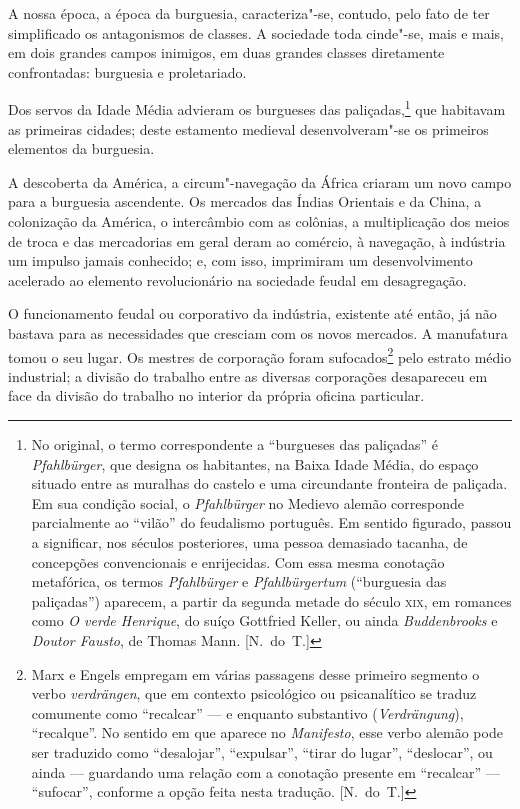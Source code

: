 A nossa época, a época da burguesia, caracteriza"-se, contudo, pelo
fato de ter simplificado os antagonismos de classes. A sociedade toda
cinde"-se, mais e mais, em dois grandes campos inimigos, em duas			\label{1}
grandes classes diretamente confrontadas: burguesia e proletariado.

Dos servos da Idade Média advieram os burgueses das   
paliçadas,\footnote{ No original, o termo correspondente a “burgueses das paliçadas” é\label{8}
\textit{Pfahlbürger}, que designa os habitantes, na Baixa Idade Média,
do espaço situado entre as muralhas do castelo e uma circundante
fronteira de paliçada. Em sua condição social, o \textit{Pfahlbürger}
no Medievo alemão corresponde parcialmente ao “vilão” do feudalismo
português. Em sentido figurado, passou a significar, nos séculos
posteriores, uma pessoa demasiado tacanha, de concepções convencionais
e enrijecidas. Com essa mesma conotação metafórica, os termos
\textit{Pfahlbürger} e \textit{Pfahlbürgertum} (“burguesia das
paliçadas”) aparecem, a partir da segunda metade do século \textsc{xix}, em
romances como \textit{O verde Henrique}, do suíço Gottfried Keller, ou
ainda \textit{Buddenbrooks} e \textit{Doutor Fausto}, de Thomas
Mann. [N.~do~T.]}
que habitavam as primeiras cidades; deste estamento medieval 
desenvolveram"-se os primeiros elementos da burguesia.

A descoberta da América, a circum"-navegação da África criaram um novo
campo para a burguesia ascendente. Os mercados das Índias Orientais e
da China, a colonização da América, o intercâmbio com as colônias, a
multiplicação dos meios de troca e das mercadorias em geral deram ao
comércio, à navegação, à indústria um impulso jamais conhecido; e, com
isso, imprimiram um desenvolvimento acelerado ao elemento
revolucionário na sociedade feudal em desagregação.

O funcionamento feudal ou corporativo da indústria, existente
até então, já não bastava para as necessidades que cresciam com os
novos mercados. A manufatura tomou o seu lugar. Os mestres de
corporação foram sufocados\footnote{ Marx e Engels empregam em várias passagens 
desse primeiro segmento o verbo \textit{verdrängen}, que em contexto psicológico 
ou psicanalítico se traduz comumente como ``recalcar''  ---  e enquanto
substantivo (\textit{Verdrängung}), ``recalque''. No sentido em que aparece 
no \textit{Manifesto}, esse verbo alemão pode ser traduzido como
``desalojar'', ``expulsar'', ``tirar do lugar'', ``deslocar'',  ou ainda  --- 
guardando uma relação com a conotação presente em ``recalcar''  --- 
``sufocar'', conforme a opção feita nesta tradução. [N.~do~T.]}
pelo estrato médio industrial; a divisão do trabalho entre as
diversas corporações desapareceu em face da divisão do trabalho no
interior da própria oficina particular.

